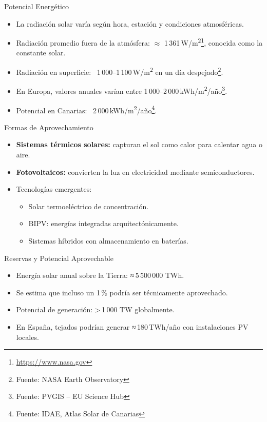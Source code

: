\documentclass[main.tex]{subfiles}
\begin{document}
\begin{frame}{Potencial Energético}
    \begin{itemize}
        \item La radiación solar varía según hora, estación y condiciones atmosféricas.
        \item Radiación promedio fuera de la atmósfera: $\approx$ 1\,361 W/m\textsuperscript{2}\footnote{\url{https://www.nasa.gov}}, conocida como la constante solar.
        \item Radiación en superficie: ~1\,000–1\,100 W/m\textsuperscript{2} en un día despejado\footnote{Fuente: NASA Earth Observatory}.
        \item En Europa, valores anuales varían entre 1 000–2 000 kWh/m\textsuperscript{2}/año\footnote{Fuente: PVGIS – EU Science Hub}.
        \item Potencial en Canarias: ~2 000 kWh/m\textsuperscript{2}/año\footnote{Fuente: IDAE, Atlas Solar de Canarias}.
    \end{itemize}
\end{frame}



\begin{frame}{Formas de Aprovechamiento}
    \begin{itemize}
        \item \textbf{Sistemas térmicos solares:} capturan el sol como calor para calentar agua o aire.
        \item \textbf{Fotovoltaicos:} convierten la luz en electricidad mediante semiconductores.
        \item Tecnologías emergentes: 
        \begin{itemize}
            \item Solar termoeléctrico de concentración.
            \item BIPV: energías integradas arquitectónicamente.
            \item Sistemas híbridos con almacenamiento en baterías.
        \end{itemize}
    \end{itemize}
\end{frame}


\begin{frame}{Reservas y Potencial Aprovechable}
    \begin{itemize}
        \item Energía solar anual sobre la Tierra: ≈ 5 500 000 TWh.
        \item Se estima que incluso un 1 \% podría ser técnicamente aprovechado.
        \item Potencial de generación: > 1 000 TW globalmente.
        \item En España, tejados podrían generar ≈ 180 TWh/año con instalaciones PV locales.
    \end{itemize}
\end{frame}
\end{document}
